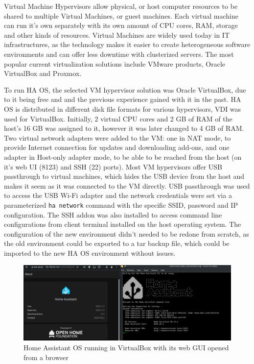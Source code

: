 Virtual Machine Hypervisors allow physical, or host computer resources to be shared to multiple Virtual Machines, or guest machines. \cite{VMwareVM} Each virtual machine can run it's own separately with its own amount of CPU cores, RAM, storage and other kinds of resources. Virtual Machines are widely used today in IT infrastructures, as the technology makes it easier to create heterogeneous software environments and can offer less downtime with clusterized servers. The most popular current virtualization solutions include VMware products, Oracle VirtualBox and Proxmox. \cite{G2freeVM}

To run HA OS, the selected VM hypervisor solution was Oracle VirtualBox, due to it being free and and the previous experience gained with it in the past. HA OS is distributed in different disk file formats for various hypervisors, VDI was used for VirtualBox. %
Initially, 2 virtual CPU cores and 2 GB of RAM of the host's 16 GB was assigned to it, however it was later changed to 4 GB of RAM. Two virtual network adapters were added to the VM: one in NAT mode, to provide Internet connection for updates and downloading add-ons, and one adapter in Host-only adapter mode, to be able to be reached from the host (on it's web UI (8123) and SSH (22) ports). Most VM hypervisors offer USB passthrough to virtual machines, which hides the USB device from the host and makes it seem as it was connected to the VM directly. USB passthrough was used to access the USB Wi-Fi adapter and the network credentials were set via a parameterized \verb+ha network+ command with the specific SSID, password and IP configuration. The SSH addon was also installed to access command line configurations from client terminal installed on the host operating system. The configuration of the new environment didn't needed to be redone from scratch, as the old environment could be exported to a tar backup file, which could be imported to the new HA OS environment without issues.

\begin{figure}[!ht]
  \centering
  \includegraphics[width=150mm, keepaspectratio]{figures/homeassistant_about.png}
  \caption{Home Assistant OS running in VirtualBox with its web GUI opened from a browser}
  \label{fig:HAabout}
\end{figure}

